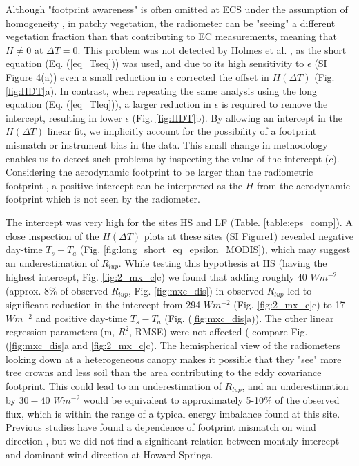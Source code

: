 \documentclass[fleqn,10pt]{wlscirep}
\begin{document}
 Although "footprint awareness" is often omitted at ECS under the assumption of ho­mogeneity \cite{chu2021representativeness}, in patchy vegetation, the radiometer can be "seeing" a different vegetation fraction than that contributing to EC measurements, meaning that $H\not= 0$ at $\Delta T=0$. This problem was not detected by Holmes et al. \cite{holmes2009land}, as the short equation (Eq. (\ref{eq_Tseq})) was used, and due to its high sensitivity to $\epsilon$ (SI Figure 4(a)) even a small reduction in $\epsilon$ corrected the offset in $H(\Delta T)$ (Fig. \ref{fig:HDT}a). In contrast, when repeating the same analysis using the long equation (Eq. (\ref{eq_Tleq})), a larger reduction in $\epsilon$ is required to remove the intercept, resulting in lower $\epsilon$ (Fig. \ref{fig:HDT}b). By allowing an intercept in the $H(\Delta T)$ linear fit, we implicitly account for the possibility of a footprint mismatch or instrument bias in the data. This small change in methodology enables us to detect such problems by inspecting the value of the intercept ($c$). Considering  the aerodynamic footprint to be larger than the radiometric footprint \cite{marcolla2018geometry,chu2021representativeness}, a positive intercept can be interpreted as the $H$ from the aerodynamic footprint which is not seen by the radiometer. 

 The intercept was very high for the sites HS and LF (Table. \ref{table:eps_comp}). A close inspection of the $H(\Delta T)$ plots at these sites (SI Figure1) revealed negative day-time $T_{s} -T_{a}$ (Fig. \ref{fig:long_short_eq_epsilon_MODIS}), which may suggest an underestimation of $R_{lup}$. While testing this hypothesis at HS (having the highest intercept, Fig. \ref{fig:2_mx_c}c) we found that  adding roughly 40 $Wm^{-2}$ (approx. 8\% of observed $R_{lup}$, Fig. \ref{fig:mxc_dis}) in observed $R_{lup}$ led to significant reduction in the intercept from 294 $Wm^{-2}$ (Fig. \ref{fig:2_mx_c}c) to 17 $Wm^{-2}$ and positive day-time $T_{s} - T_{a}$ (Fig. (\ref{fig:mxc_dis}a)). The other linear regression parameters (m, $R^{2}$, RMSE) were not affected ( compare Fig. (\ref{fig:mxc_dis}a and \ref{fig:2_mx_c}c). The hemispherical view of the radiometers looking down at a heterogeneous canopy makes it possible that they "see" more tree crowns and less soil than the area contributing to the eddy covariance footprint. This could lead to an underestimation of $R_{lup}$, and an underestimation by $30-40$ $Wm^{-2}$ would be equivalent to approximately 5-10$\%$ of the observed flux, which is within the range of a typical energy imbalance found at this site. Previous studies have found a dependence of footprint mismatch on wind direction \cite{chu2021representativeness,marcolla2018geometry,morillas2013using}, but we did not find a significant relation between monthly intercept and dominant wind direction at Howard Springs.
 
\end{document}
